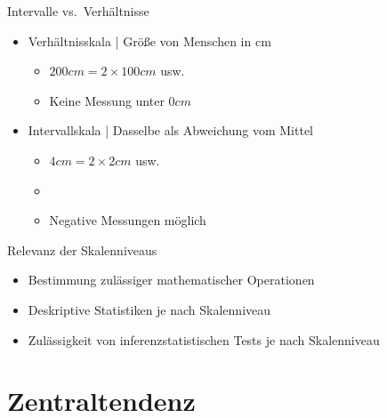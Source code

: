 \begin{frame}
  {Intervalle vs.\ Verhältnisse}
  \begin{itemize}[<+->]
    \item \alert{Verhältnisskala} | Größe von Menschen in cm
      \begin{itemize}[<+->]
	\item $200 cm = 2 \times 100 cm$ usw.
	\item Keine Messung unter $0 cm$ 
      \end{itemize}
      \Zeile
    \item \alert{Intervallskala} | Dasselbe als \alert{Abweichung vom Mittel}
      \begin{itemize}[<+->]
	\item $4 cm = 2 \times 2 cm$ usw.
        \item \orongsch{$184 cm \neq 2 \times 182 cm$}
	\item Negative Messungen möglich
      \end{itemize}
  \end{itemize}
\end{frame}

\begin{frame}
  {Relevanz der Skalenniveaus}
  \begin{itemize}[<+->]
    \item Bestimmung \alert{zulässiger mathematischer Operationen}
      \Halbzeile
    \item \alert{Deskriptive Statistiken} je nach Skalenniveau
      \Halbzeile
    \item Zulässigkeit von \alert{inferenzstatistischen Tests} je nach Skalenniveau
  \end{itemize}
\end{frame}


\section{Zentraltendenz}

